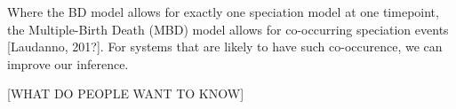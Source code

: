 %
%
%

Where the BD model allows for exactly one speciation model at one timepoint,
the Multiple-Birth Death (MBD) model allows for co-occurring 
speciation events [Laudanno, 201?]. For systems that are likely
to have such co-occurence, we can improve our inference.







[WHAT DO PEOPLE WANT TO KNOW]
